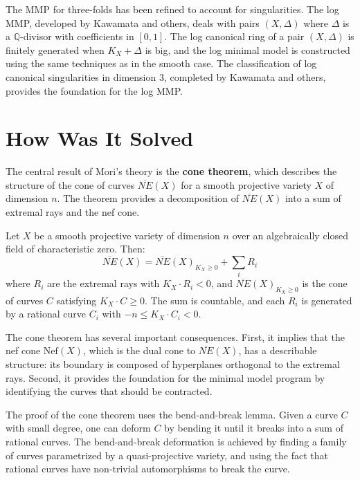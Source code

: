 The MMP for three-folds has been refined to account for singularities. The log
MMP, developed by Kawamata and others, deals with pairs $(X, \Delta)$ where
$\Delta$ is a $\mathbb{Q}$-divisor with coefficients in $[0,1]$. The log
canonical ring of a pair $(X, \Delta)$ is finitely generated when $K_X + \Delta$
is big, and the log minimal model is constructed using the same techniques as
in the smooth case. The classification of log canonical singularities in
dimension 3, completed by Kawamata and others, provides the foundation for the
log MMP.

\section{How Was It Solved}

The central result of Mori's theory is the \textbf{cone theorem}, which describes
the structure of the cone of curves $\overline{NE}(X)$ for a smooth projective
variety $X$ of dimension $n$. The theorem provides a decomposition of
$\overline{NE}(X)$ into a sum of extremal rays and the nef cone.

\begin{theorem}
Let $X$ be a smooth projective variety of dimension $n$ over an algebraically
closed field of characteristic zero. Then:
\[
\overline{NE}(X) = \overline{NE}(X)_{K_X \geq 0} + \sum_{i} R_i
\]
where $R_i$ are the extremal rays with $K_X \cdot R_i < 0$, and
$\overline{NE}(X)_{K_X \geq 0}$ is the cone of curves $C$ satisfying
$K_X \cdot C \geq 0$. The sum is countable, and each $R_i$ is generated by a
rational curve $C_i$ with $-n \leq K_X \cdot C_i < 0$.
\end{theorem}

The cone theorem has several important consequences. First, it implies that the
nef cone $\text{Nef}(X)$, which is the dual cone to $\overline{NE}(X)$, has a
describable structure: its boundary is composed of hyperplanes orthogonal to
the extremal rays. Second, it provides the foundation for the minimal model
program by identifying the curves that should be contracted.

The proof of the cone theorem uses the bend-and-break lemma. Given a curve
$C$ with small degree, one can deform $C$ by bending it until it breaks into a
sum of rational curves. The bend-and-break deformation is achieved by finding a
family of curves parametrized by a quasi-projective variety, and using the fact
that rational curves have non-trivial automorphisms to break the curve.


